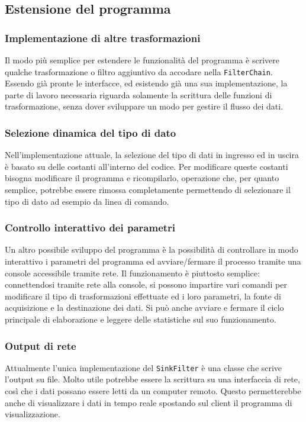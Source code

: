 \subsection{Estensione del programma}

\subsubsection{Implementazione di altre trasformazioni}
Il modo pi\`u semplice per estendere le funzionalit\`a del programma \`e
scrivere qualche trasformazione o filtro aggiuntivo da accodare nella
\texttt{FilterChain}. Essendo gi\`a pronte le interfacce, ed esistendo gi\`a una
sua implementazione, la parte di lavoro necessaria riguarda solamente la
scrittura delle funzioni di trasformazione, senza dover sviluppare un modo per
gestire il flusso dei dati.

\subsubsection{Selezione dinamica del tipo di dato}
\label{dyn_dtype}
Nell'implementazione attuale, la selezione del tipo di dati in ingresso ed in
uscira \`e basato su delle costanti all'interno del codice. Per modificare
queste costanti bisogna modificare il programma e ricompilarlo, operazione che,
per quanto semplice, potrebbe essere rimossa completamente permettendo di
selezionare il tipo di dato ad esempio da linea di comando.

\subsubsection{Controllo interattivo dei parametri}
Un altro possibile sviluppo del programma \`e la possibilit\`a di controllare in
modo interattivo i parametri del programma ed avviare/fermare il processo
tramite una console accessibile tramite rete. Il funzionamento \`e piuttosto
semplice: connettendosi tramite rete alla console, si possono impartire vari
comandi per modificare il tipo di trasformazioni effettuate ed i loro parametri,
la fonte di acquisizione e la destinazione dei dati. Si può anche avviare e
fermare il ciclo principale di elaborazione e leggere delle statistiche sul suo
funzionamento.

\subsubsection{Output di rete}
Attualmente l'unica implementazione del \texttt{SinkFilter} \`e una classe che
scrive l'output su file. Molto utile potrebbe essere la scrittura su una
interfaccia di rete, cos\`i che i dati possano essere letti da un computer
remoto. Questo permetterebbe anche di visualizzare i dati in tempo reale
spostando sul client il programma di visualizzazione.

